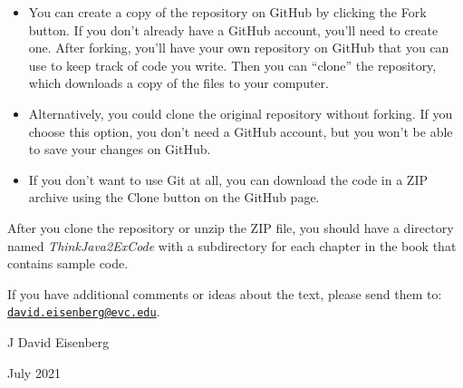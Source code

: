 \begin{itemize}

\item You can create a copy of the repository on GitHub by clicking the {\sf Fork} button.
If you don't already have a GitHub account, you'll need to create one.
After forking, you'll have your own repository on GitHub that you can use to keep track of code you write.
Then you can ``clone'' the repository, which downloads a copy of the files to your computer.

\item Alternatively, you could clone the original repository without forking.
If you choose this option, you don't need a GitHub account, but you won't be able to save your changes on GitHub.

\item If you don't want to use Git at all, you can download the code in a ZIP archive using the {\sf Clone} button on the GitHub page.

\end{itemize}

After you clone the repository or unzip the ZIP file, you should have a directory named {\it ThinkJava2ExCode} with a subdirectory for each chapter in the book that contains sample code.


If you have additional comments or ideas about the text, please send them to: \href{mailto:david.eisenberg@evc.edu}{\tt david.eisenberg@evc.edu}.

\hfill J David Eisenberg

\hfill July 2021
